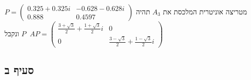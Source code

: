 \documentclass{article}
\DeclareMathOperator{\adj}{^\ast}
\begin{document}
מטריצה אוניטרית המלכסת את $A_3$ תהיה $P=\begin{pmatrix}
        0.325+0.325i & -0.628-0.628i \\
        0.888        & 0.4597
    \end{pmatrix}$ ונקבל $P\adj A P=\begin{pmatrix}
        \frac{3+\sqrt{3}}{2}+\frac{1+\sqrt{3}}{2}i & 0                                          \\
        0                                          & \frac{3-\sqrt{3}}{2}+\frac{1-\sqrt{3}}{2}i
    \end{pmatrix}$

\subsection*{סעיף ב}
\end{document}
